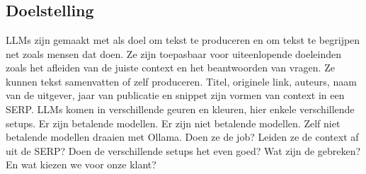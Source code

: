 
\chapter{}%
\label{ch:nlp}

\section{Doelstelling}
LLMs zijn gemaakt met als doel om tekst te produceren en om tekst te begrijpen net zoals mensen dat doen. Ze zijn toepasbaar voor uiteenlopende doeleinden zoals het afleiden van de juiste context en het beantwoorden van vragen. Ze kunnen tekst samenvatten of zelf produceren.
Titel, originele link, auteurs, naam van de uitgever, jaar van publicatie en snippet zijn vormen van context in een SERP.
LLMs komen in verschillende geuren en kleuren, hier enkele verschillende setups.
Er zijn betalende modellen.
Er zijn niet betalende modellen.
Zelf niet betalende modellen draaien met Ollama.
Doen ze de job? Leiden ze de context af uit de SERP? Doen de verschillende setups het even goed? Wat zijn de gebreken? En wat kiezen we voor onze klant?

